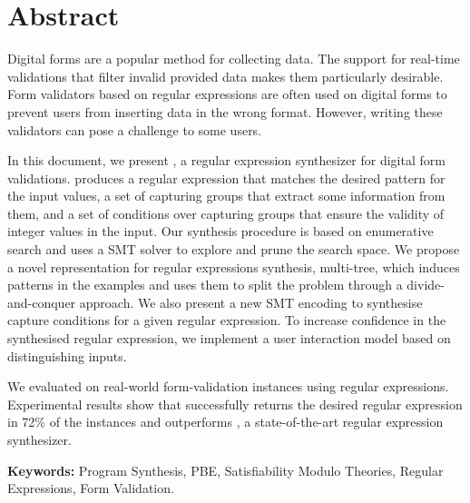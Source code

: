 \section*{Abstract}

Digital forms are a popular method for collecting data.
The support for real-time validations that filter invalid provided data makes them particularly desirable.
Form validators based on regular expressions are often used on digital forms to prevent users from inserting data in the wrong format.
However, writing these validators can pose a challenge to some users.

In this document, we present \Forest, a regular expression synthesizer for digital form validations.
\Forest produces a regular expression that matches the desired pattern for the input values, a set of capturing groups that extract some information from them,
and 
a set of conditions over capturing groups that ensure the validity of integer values in the input.
Our synthesis procedure is based on enumerative search and uses a \ac{SMT} solver to explore and prune the search space.
We propose a novel representation for regular expressions synthesis, multi-tree, which induces patterns in the examples and uses them to split the problem through a divide-and-conquer approach.
We also present a new \ac{SMT} encoding to synthesise capture conditions for a given regular expression.
To increase confidence in the synthesised regular expression, we implement a user interaction model based on distinguishing inputs. 

We evaluated \Forest{} on real-world form-validation instances using regular expressions. Experimental results show that \Forest{} successfully returns the desired regular expression in 72\% of the instances and outperforms \Regel, a state-of-the-art regular expression synthesizer.

\vfill
\noindent
\textbf{\Large Keywords:} Program Synthesis, \acl{PBE}, Satisfiability Modulo Theories, Regular Expressions, Form Validation.
\cleardoublepage
